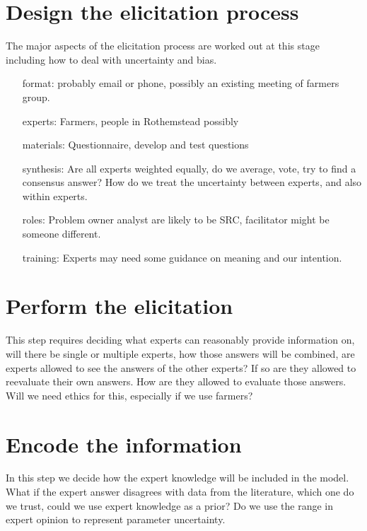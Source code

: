 \documentclass[12pt, a4paper]{article}
\begin{document}
\section{Design the elicitation process}
The major aspects of the elicitation process are worked out at this stage including how to deal with uncertainty and bias. 
\begin{enumerate}
	\item[format:] probably email or phone, possibly an existing meeting of farmers group.
	\item[experts:] Farmers, people in Rothemstead possibly
	\item[materials:] Questionnaire, develop and test questions
	\item[synthesis:] Are all experts weighted equally, do we average, vote, try to find a consensus answer? How do we treat the uncertainty between experts, and also within experts.
	\item[roles:] Problem owner analyst are likely to be SRC, facilitator might be someone different.
	\item[training:] Experts may need some guidance on meaning and our intention.    
\end{enumerate}

\section{Perform the elicitation}
This step requires deciding what experts can reasonably provide information on, will there be single or multiple experts, how those answers will be combined, are experts allowed to see the answers of the other experts? If so are they allowed to reevaluate their own answers. How are they allowed to evaluate those answers. Will we need ethics for this, especially if we use farmers?

\section{Encode the information}
In this step we decide how the expert knowledge will be included in the model. What if the expert answer disagrees with data from the literature, which one do we trust, could we use expert knowledge as a prior? Do we use the range in expert opinion to represent parameter uncertainty. 


 

\end{document}
